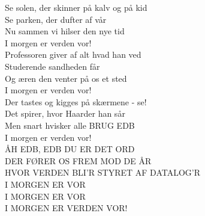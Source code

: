 Se solen, der skinner på kalv og på kid\\
Se parken, der dufter af vår\\
Nu sammen vi hilser den nye tid\\
I morgen er verden vor!\\

Professoren giver af alt hvad han ved\\
Studerende sandheden får\\
Og æren den venter på os et sted\\
I morgen er verden vor!\\

Der tastes og kigges på skærmene - se!\\
Det spirer, hvor Haarder han sår\\
Men snart hvisker alle BRUG EDB\\
I morgen er verden vor!\\

ÅH EDB, EDB DU ER DET ORD\\
DER FØRER OS FREM MOD DE ÅR\\
HVOR VERDEN BLI'R STYRET AF DATALOG'R\\
I MORGEN ER VOR\\
I MORGEN ER VOR\\
I MORGEN ER VERDEN VOR!\\
